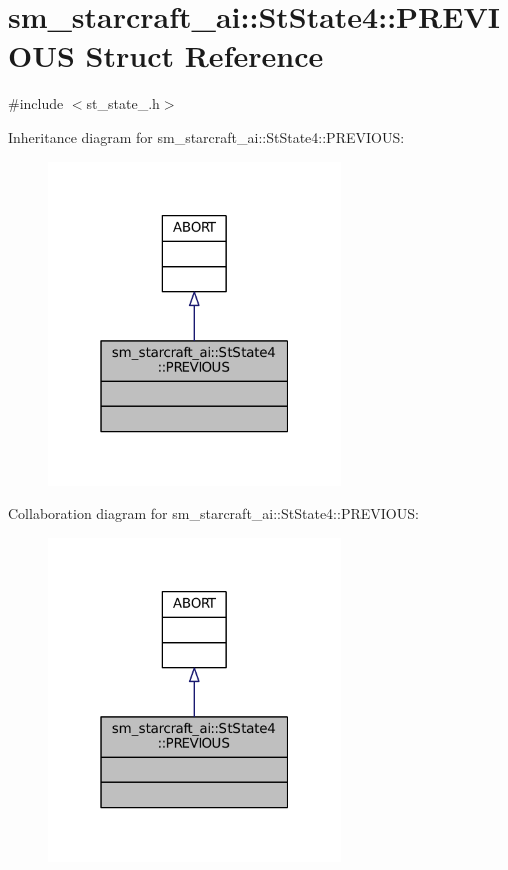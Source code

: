 \hypertarget{structsm__starcraft__ai_1_1StState4_1_1PREVIOUS}{}\section{sm\+\_\+starcraft\+\_\+ai\+:\+:St\+State4\+:\+:P\+R\+E\+V\+I\+O\+US Struct Reference}
\label{structsm__starcraft__ai_1_1StState4_1_1PREVIOUS}


{\ttfamily \#include $<$st\+\_\+state\+\_.\+h$>$}



Inheritance diagram for sm\+\_\+starcraft\+\_\+ai\+:\+:St\+State4\+:\+:P\+R\+E\+V\+I\+O\+US\+:
\nopagebreak
\begin{figure}[H]
\begin{center}
\leavevmode
\includegraphics[width=220pt]{structsm__starcraft__ai_1_1StState4_1_1PREVIOUS__inherit__graph}
\end{center}
\end{figure}


Collaboration diagram for sm\+\_\+starcraft\+\_\+ai\+:\+:St\+State4\+:\+:P\+R\+E\+V\+I\+O\+US\+:
\nopagebreak
\begin{figure}[H]
\begin{center}
\leavevmode
\includegraphics[width=220pt]{structsm__starcraft__ai_1_1StState4_1_1PREVIOUS__coll__graph}
\end{center}
\end{figure}



